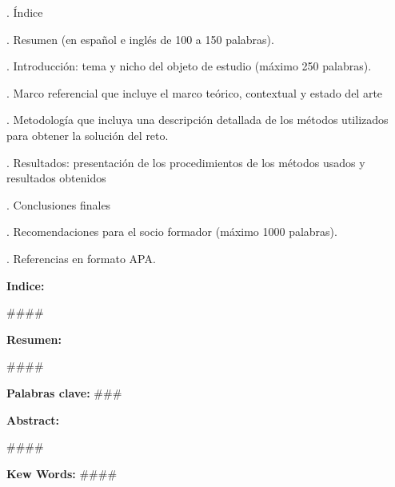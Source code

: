\documentclass[a4paper,12pt]{article}
\begin{document}
{. Índice}



{. Resumen (en español e inglés de 100 a 150 palabras).}



{. Introducción: tema y nicho del objeto de estudio (máximo 250 palabras).}



{. Marco referencial que incluye el marco teórico, contextual y estado del arte}



{. Metodología que incluya una descripción detallada de los métodos utilizados para obtener la solución del reto.}



{. Resultados: presentación de los procedimientos de los métodos usados y resultados obtenidos}



{. Conclusiones finales}



{. Recomendaciones para el socio formador (máximo 1000 palabras).}



{. Referencias en formato APA.}
\begin{center}

\pagebreak


\textbf{{\selectfont Indice:}}

{\selectfont \#\#\#\#}





\textbf{{\selectfont Resumen:}}
\end{center}
{\small {\selectfont \#\#\#\#}}
\begin{center}


{\small {\selectfont \textbf{Palabras clave:} \#\#\#}}



\textbf{{\selectfont Abstract:}}
\end{center}
{\small {\selectfont \#\#\#\#}}
\begin{center}


{\small {\selectfont \textbf{Kew Words:} \#\#\#\#}}



\end{center}
\end{document}
